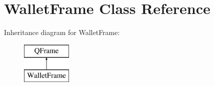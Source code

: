 \hypertarget{class_wallet_frame}{}\section{Wallet\+Frame Class Reference}
\label{class_wallet_frame}
Inheritance diagram for Wallet\+Frame\+:\begin{figure}[H]
\begin{center}
\leavevmode
\includegraphics[height=2.000000cm]{class_wallet_frame}
\end{center}
\end{figure}
